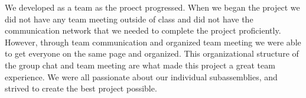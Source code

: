 We developed as a team as the proect progressed.  When we began the project we did not have any team meeting outside of class and did not have the communication network that we needed to complete the project proficiently.  However, through team communication and organized team meeting we were able to get everyone on the same page and organized.  This organizational structure of the group chat and team meeting are what made this project a great team experience.  We were all passionate about our individual subassemblies, and strived to create the best project possible.
